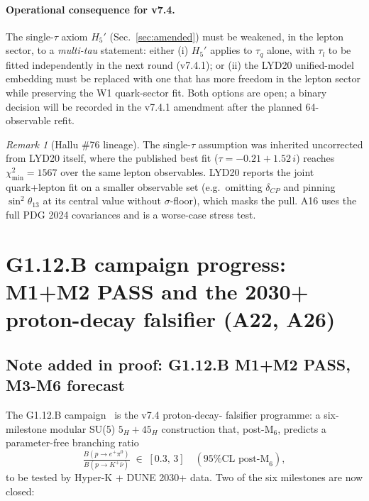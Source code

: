 \documentclass[a4paper,11pt]{article}
\theoremstyle{definition}
\theoremstyle{remark}
\newtheorem{remark}[theorem]{Remark}
\begin{document}
\paragraph{Operational consequence for v7.4.}
The single-$\tau$ axiom $H_5'$ (Sec.~\ref{sec:amended}) must be
weakened, in the lepton sector, to a \emph{multi-tau} statement:
either (i) $H_5'$ applies to $\tau_q$ alone, with $\tau_l$ to be
fitted independently in the next round (v7.4.1); or (ii) the LYD20
unified-model embedding must be replaced with one that has more
freedom in the lepton sector while preserving the W1
quark-sector fit.  Both options are open; a binary decision will be
recorded in the v7.4.1 amendment after the planned 64-observable
refit.

\begin{remark}[Hallu \#76 lineage]
The single-$\tau$ assumption was inherited uncorrected from LYD20
itself, where the published best fit ($\tau=-0.21+1.52\,i$) reaches
$\chi^2_{\min}=1567$ over the same lepton observables.  LYD20 reports
the joint quark+lepton fit on a smaller observable set (e.g.\ omitting
$\delta_{CP}$ and pinning $\sin^2\theta_{13}$ at its central value
without $\sigma$-floor), which masks the pull.  A16 uses the full PDG
2024 covariances and is a worse-case stress test.
\end{remark}

\section{G1.12.B campaign progress: M1+M2 PASS
         and the 2030+ proton-decay falsifier (A22, A26)}
\label{sec:G112B}

\subsection{Note added in proof: G1.12.B M1+M2 PASS, M3-M6 forecast}
\label{sec:G112BNote}

The G1.12.B campaign~\cite{A18scoping} is the v7.4 proton-decay-
falsifier programme: a six-milestone modular SU(5) $5_H+45_H$
construction that, post-M$_6$, predicts a parameter-free branching
ratio
\[
  \tfrac{B(p\to e^+\pi^0)}{B(p\to K^+\bar\nu)} \;\in\; [0.3,\,3]
  \quad(\text{95\% CL post-M}_6),
\]
to be tested by Hyper-K + DUNE 2030+ data.  Two of the six milestones
are now closed:
\end{document}
